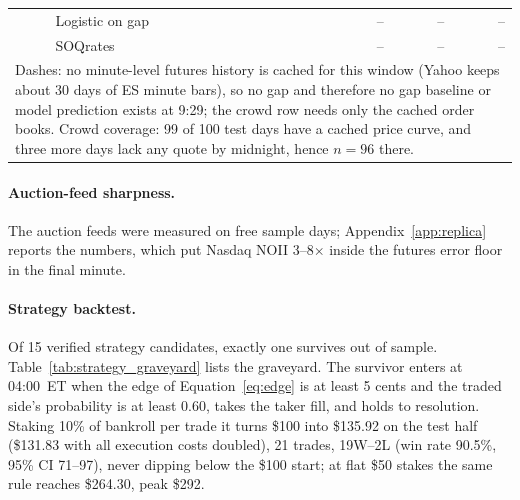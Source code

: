 \begin{table}[h]
\begin{tabular}{llrrr}
              & Logistic on gap              & --  & --     & --     \\
              & SOQrates                     & --  & --     & --     \\
        \bottomrule
        \multicolumn{5}{p{0.88\linewidth}}{\footnotesize Dashes: no
        minute-level futures history is cached for this window (Yahoo keeps
        about 30 days of ES minute bars), so no gap and therefore no gap
        baseline or model prediction exists at 9:29; the crowd row needs only
        the cached order books. Crowd coverage: 99 of 100 test days have a
        cached price curve, and three more days lack any quote by midnight,
        hence $n=96$ there.} \\
    \end{tabular}
\end{table}

\paragraph{Auction-feed sharpness.}
The auction feeds were measured on free sample days;
Appendix~\ref{app:replica} reports the numbers, which put Nasdaq NOII
3--8$\times$ inside the futures error floor in the final minute.

\paragraph{Strategy backtest.}
Of 15 verified strategy candidates, exactly one survives out of sample.
Table~\ref{tab:strategy_graveyard} lists the graveyard. The survivor enters
at 04:00~ET when the edge of Equation~\ref{eq:edge} is at least 5 cents
and the traded side's probability is at least 0.60, takes the taker fill,
and holds to resolution. Staking 10\% of bankroll per trade it turns \$100
into \$135.92 on the test half (\$131.83 with all execution costs doubled),
21 trades, 19W--2L (win rate 90.5\%, 95\% CI 71--97), never dipping below
the \$100 start; at flat \$50 stakes the same rule reaches \$264.30, peak
\$292.

